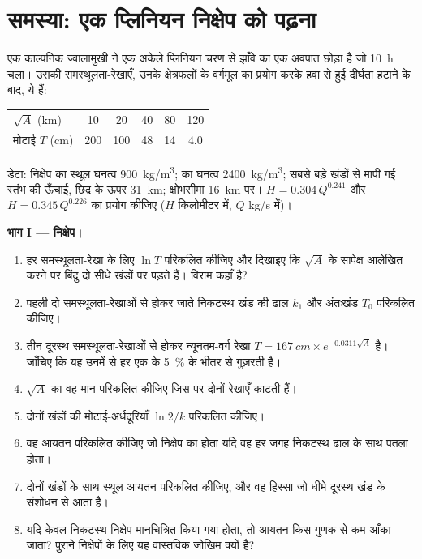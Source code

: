 \section{समस्या: एक प्लिनियन निक्षेप को पढ़ना}

\begin{problem}
\label{pb:b2:eruptive-styles:1}
एक काल्पनिक ज्वालामुखी ने एक अकेले प्लिनियन चरण से झाँवे का एक अवपात छोड़ा है जो
\qty{10}{\hour} चला। उसकी समस्थूलता-रेखाएँ, उनके क्षेत्रफलों के वर्गमूल का प्रयोग करके
हवा से हुई दीर्घता हटाने के बाद, ये हैं:
\begin{center}
\small
\begin{tabular}{lccccc}
\hline
$\sqrt A$ (\unit{km}) & 10 & 20 & 40 & 80 & 120 \\
मोटाई $T$ (\unit{cm}) & 200 & 100 & 48 & 14 & 4.0 \\
\hline
\end{tabular}
\end{center}
डेटा: निक्षेप का स्थूल घनत्व \qty{900}{kg/m^3};  का घनत्व
\qty{2400}{kg/m^3}; सबसे बड़े खंडों से मापी गई स्तंभ की ऊँचाई,
छिद्र के ऊपर \qty{31}{km}; क्षोभसीमा \qty{16}{km} पर। $H =
0.304\,Q^{0.241}$ और $H = 0.345\,Q^{0.226}$ का प्रयोग कीजिए ($H$ किलोमीटर में, $Q$
\unit{kg/s} में)।

\medskip\noindent\textbf{भाग I --- निक्षेप।}
\begin{enumerate}
\item हर समस्थूलता-रेखा के लिए $\ln T$ परिकलित कीजिए और दिखाइए कि $\sqrt A$ के सापेक्ष आलेखित करने पर
बिंदु दो सीधे खंडों पर पड़ते हैं। विराम कहाँ है?
\item पहली दो समस्थूलता-रेखाओं से होकर जाते निकटस्थ खंड की ढाल $k_1$ और
अंतःखंड $T_0$ परिकलित कीजिए।
\item तीन दूरस्थ समस्थूलता-रेखाओं से होकर न्यूनतम-वर्ग रेखा $T =
\qty{167}{cm}\times e^{-0.0311\sqrt A}$ है। जाँचिए कि यह उनमें से हर एक के
\qty{5}{\percent} के भीतर से गुज़रती है।
\item $\sqrt A$ का वह मान परिकलित कीजिए जिस पर दोनों रेखाएँ काटती हैं।
\item दोनों खंडों की मोटाई-अर्धदूरियाँ $\ln 2/k$ परिकलित कीजिए।
\item वह आयतन परिकलित कीजिए जो निक्षेप का होता यदि वह हर जगह निकटस्थ
ढाल के साथ पतला होता।
\item दोनों खंडों के साथ स्थूल आयतन परिकलित कीजिए, और वह हिस्सा जो
धीमे दूरस्थ खंड के संशोधन से आता है।
\item यदि केवल निकटस्थ निक्षेप मानचित्रित किया गया होता, तो आयतन किस गुणक से कम आँका
जाता? पुराने निक्षेपों के लिए यह वास्तविक जोखिम क्यों है?
\end{enumerate}


\end{problem}
